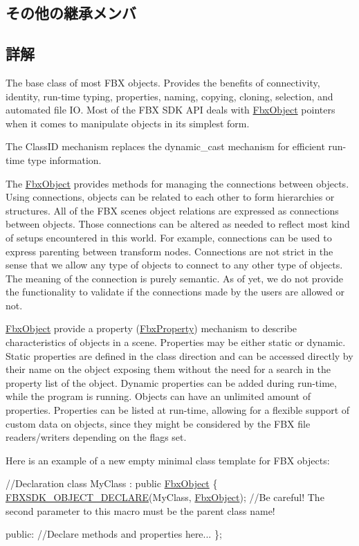 \subsection*{その他の継承メンバ}


\subsection{詳解}
The base class of most F\+BX objects. Provides the benefits of connectivity, identity, run-\/time typing, properties, naming, copying, cloning, selection, and automated file IO. Most of the F\+BX S\+DK A\+PI deals with \hyperlink{class_fbx_object}{Fbx\+Object} pointers when it comes to manipulate objects in its simplest form.

The Class\+ID mechanism replaces the dynamic\+\_\+cast mechanism for efficient run-\/time type information.

The \hyperlink{class_fbx_object}{Fbx\+Object} provides methods for managing the connections between objects. Using connections, objects can be related to each other to form hierarchies or structures. All of the F\+BX scene\textquotesingle{}s object relations are expressed as connections between objects. Those connections can be altered as needed to reflect most kind of setups encountered in this world. For example, connections can be used to express parenting between transform nodes. Connections are not strict in the sense that we allow any type of objects to connect to any other type of objects. The meaning of the connection is purely semantic. As of yet, we do not provide the functionality to validate if the connections made by the users are allowed or not.

\hyperlink{class_fbx_object}{Fbx\+Object} provide a property (\hyperlink{class_fbx_property}{Fbx\+Property}) mechanism to describe characteristics of objects in a scene. Properties may be either static or dynamic. Static properties are defined in the class direction and can be accessed directly by their name on the object exposing them without the need for a search in the property list of the object. Dynamic properties can be added during run-\/time, while the program is running. Objects can have an unlimited amount of properties. Properties can be listed at run-\/time, allowing for a flexible support of custom data on objects, since they might be considered by the F\+BX file readers/writers depending on the flags set.

Here is an example of a new empty minimal class template for F\+BX objects\+: 
\begin{DoxyCode}
\textcolor{comment}{//Declaration}
\textcolor{keyword}{class }MyClass : \textcolor{keyword}{public} \hyperlink{class_fbx_object}{FbxObject}
\{
    \hyperlink{fbxobject_8h_a1628eb1d9b23ef9ce13f4406689fe50e}{FBXSDK\_OBJECT\_DECLARE}(MyClass, \hyperlink{class_fbx_object}{FbxObject});  \textcolor{comment}{//Be careful! The second
       parameter to this macro must be the parent class name!}

\textcolor{keyword}{public}:
    \textcolor{comment}{//Declare methods and properties here...}
\};
\end{DoxyCode}
 
